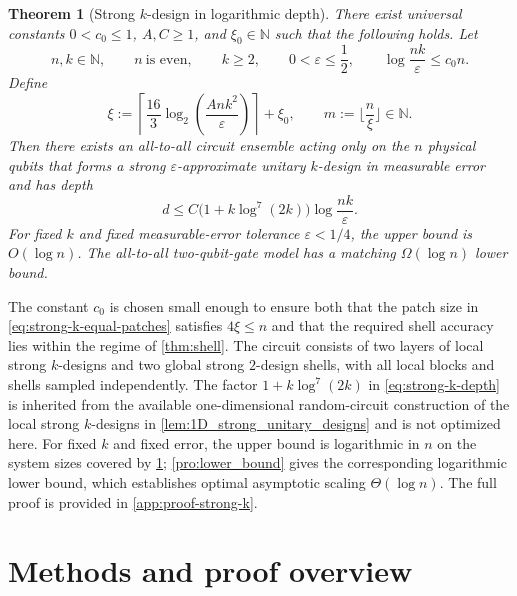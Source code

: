 \documentclass[
    aps,
    superscriptaddress,
    onecolumn,
    10pt,
    prx,
    nofootinbib
]{revtex4-2}
\newtheorem{theorem}{Theorem}
\theoremstyle{namedstatement}
\theoremstyle{plain}
\begin{document}
\begin{theorem}[Strong $k$-design in logarithmic depth]\label{thm:strong-k}
There exist universal constants $0<c_0\leq 1$, $A,C\geq 1$, and $\xi_0\in\mathbb N$ such that the following holds. Let
\begin{equation}\label{eq:strong-k-parameter-range}
    n,k\in\mathbb N,
    \qquad
    n\ \text{is even},
    \qquad
    k\geq 2,
    \qquad
    0<\varepsilon\leq\frac12,
    \qquad
    \log\frac{nk}{\varepsilon}\leq c_0n.
\end{equation}
Define
\begin{equation}
    \xi := \left\lceil \frac{16}{3}\log_2\left(\frac{Ank^2}{\varepsilon}\right)\right\rceil+\xi_0,
    \qquad
    m:=\lfloor\frac{n}{\xi}\rfloor\in\mathbb{N}.
    \label{eq:strong-k-equal-patches}
\end{equation}
Then there exists an all-to-all circuit ensemble acting only on the $n$ physical qubits that forms a strong $\varepsilon$-approximate unitary $k$-design in measurable error and has depth
\begin{equation}\label{eq:strong-k-depth}
    d
    \leq
    C\bigl(1+k\log^7(2k)\bigr)
    \log\frac{nk}{\varepsilon}.
\end{equation}
For fixed $k$ and fixed measurable-error tolerance $\varepsilon < 1/4$, the upper bound is $O(\log n)$. The all-to-all two-qubit-gate model has a matching $\Omega(\log n)$ lower bound.
\end{theorem}

The constant $c_0$ is chosen small enough to ensure both that the patch size in \cref{eq:strong-k-equal-patches} satisfies $4\xi\leq n$ and that the required shell accuracy lies within the regime of \cref{thm:shell}. The circuit consists of two layers of local strong $k$-designs and two global strong $2$-design shells, with all local blocks and shells sampled independently. The factor $1+k\log^7(2k)$ in \cref{eq:strong-k-depth} is inherited from the available one-dimensional random-circuit construction of the local strong $k$-designs in \cref{lem:1D_strong_unitary_designs} and is not optimized here.
For fixed $k$ and fixed error, the upper bound is logarithmic in $n$ on the system sizes covered by \cref{thm:strong-k}; \cref{pro:lower_bound} gives the corresponding logarithmic lower bound, which establishes optimal asymptotic scaling $\Theta(\log n)$. The full proof is provided in \cref{app:proof-strong-k}.



\section{Methods and proof overview}\label{sec:methods}
\end{document}
